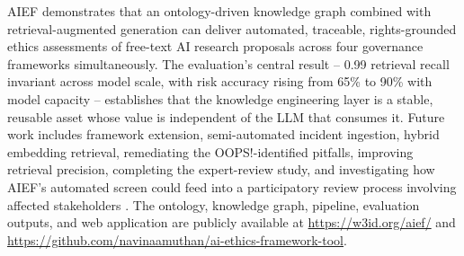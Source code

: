 \documentclass[a4paper,oneside,12pt]{book}
\numberwithin{equation}{chapter}
\begin{document}
AIEF demonstrates that an ontology-driven knowledge graph combined with retrieval-augmented generation can deliver automated, traceable, rights-grounded ethics assessments of free-text AI research proposals across four governance frameworks simultaneously. The evaluation's central result -- 0.99 retrieval recall invariant across model scale, with risk accuracy rising from 65\% to 90\% with model capacity -- establishes that the knowledge engineering layer is a stable, reusable asset whose value is independent of the LLM that consumes it. Future work includes framework extension, semi-automated incident ingestion, hybrid embedding retrieval, remediating the OOPS!-identified pitfalls, improving retrieval precision, completing the expert-review study, and investigating how AIEF's automated screen could feed into a participatory review process involving affected stakeholders \cite{jarvers2026engaged,ullstein2026pafria}. The ontology, knowledge graph, pipeline, evaluation outputs, and web application are publicly available at \url{https://w3id.org/aief/} and \url{https://github.com/navinaamuthan/ai-ethics-framework-tool}.



\end{document}
